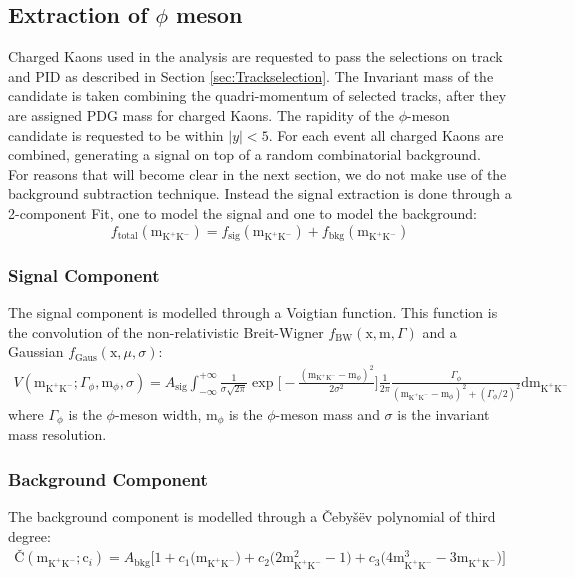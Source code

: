 \subsection{Extraction of $\phi$ meson}
Charged Kaons used in the analysis are requested to pass the selections on track and PID as described in Section \ref{sec:Trackselection}. The Invariant mass of the candidate is taken combining the quadri-momentum of selected tracks, after they are assigned PDG mass for charged Kaons. The rapidity of the $\phi$-meson candidate is requested to be within $|y| < 5$. For each event all charged Kaons are combined, generating a signal on top of a random combinatorial background.\\
\indent For reasons that will become clear in the next section, we do not make use of the background subtraction technique. Instead the signal extraction is done through a 2-component Fit, one to model the signal and one to model the background:
\begin{equation}
f_{\text{total}}(\text{m}_{\text{K}^+\text{K}^-}) = f_{\text{sig}}(\text{m}_{\text{K}^+\text{K}^-}) + f_{\text{bkg}}(\text{m}_{\text{K}^+\text{K}^-})
\end{equation}
\subsubsection{Signal Component} The signal component is modelled through a Voigtian function. This function is the convolution of the non-relativistic Breit-Wigner $f_{\text{BW}}(\text{x},\text{m},\Gamma)$ and a Gaussian $f_{\text{Gaus}}(\text{x},\mu,\sigma)$:
\begin{eqnarray}
V(\text{m}_{\text{K}^+\text{K}^-};\Gamma_{\phi},\text{m}_{\phi},\sigma) = A_{\text{sig}}\int_{-\infty}^{+\infty}\frac{1}{\sigma\sqrt{2\pi}}\exp{\Big[ -\frac{(\text{m}_{\text{K}^+\text{K}^-}-\text{m}_{\phi})^2}{2\sigma^2} \Big]}\frac{1}{2\pi}\frac{\Gamma_{\phi}}{(\text{m}_{\text{K}^+\text{K}^-}-\text{m}_{\phi})^2+(\Gamma_{\phi}/2)^2}\text{d}\text{m}_{\text{K}^+\text{K}^-}
\end{eqnarray}
where $\Gamma_{\phi}$ is the $\phi$-meson width, $\text{m}_{\phi}$ is the $\phi$-meson mass and $\sigma$ is the invariant mass resolution.
\subsubsection{Background Component} The background component is modelled through a \v{C}eby\v{s}\"{e}v polynomial of third degree:
\begin{eqnarray}
\text{\v{C}}(\text{m}_{\text{K}^+\text{K}^-};\text{c}_i) = A_{\text{bkg}}\Big[1+ c_1\Big(\text{m}_{\text{K}^+\text{K}^-}\Big)+ c_2\Big(2\text{m}_{\text{K}^+\text{K}^-}^2-1\Big)+ c_3\Big(4\text{m}_{\text{K}^+\text{K}^-}^3-3\text{m}_{\text{K}^+\text{K}^-}\Big)\Big]
\end{eqnarray}

